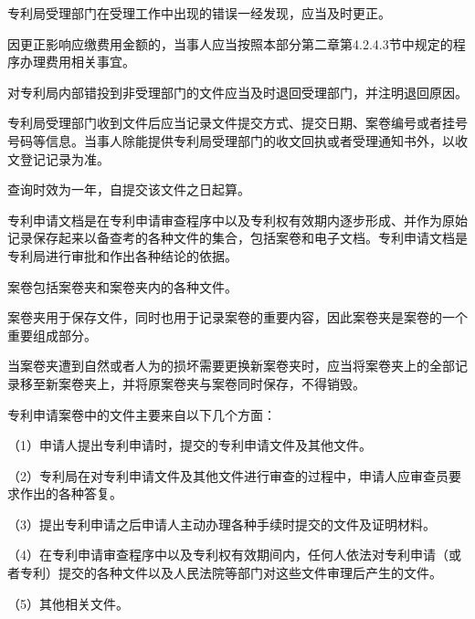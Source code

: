 专利局受理部门在受理工作中出现的错误一经发现，应当及时更正。

因更正影响应缴费用金额的，当事人应当按照本部分第二章第4.2.4.3节中规定的程序办理费用相关事宜。

对专利局内部错投到非受理部门的文件应当及时退回受理部门，并注明退回原因。

专利局受理部门收到文件后应当记录文件提交方式、提交日期、案卷编号或者挂号号码等信息。当事人除能提供专利局受理部门的收文回执或者受理通知书外，以收文登记记录为准。

查询时效为一年，自提交该文件之日起算。

专利申请文档是在专利申请审查程序中以及专利权有效期内逐步形成、并作为原始记录保存起来以备查考的各种文件的集合，包括案卷和电子文档。专利申请文档是专利局进行审批和作出各种结论的依据。

案卷包括案卷夹和案卷夹内的各种文件。

案卷夹用于保存文件，同时也用于记录案卷的重要内容，因此案卷夹是案卷的一个重要组成部分。

当案卷夹遭到自然或者人为的损坏需要更换新案卷夹时，应当将案卷夹上的全部记录移至新案卷夹上，并将原案卷夹与案卷同时保存，不得销毁。

专利申请案卷中的文件主要来自以下几个方面：

{\setlength{\parindent}{17.1bp}（1）申请人提出专利申请时，提交的专利申请文件及其他文件。\par}

{\setlength{\parindent}{17.1bp}（2）专利局在对专利申请文件及其他文件进行审查的过程中，申请人应审查员要求作出的各种答复。\par}

{\setlength{\parindent}{17.1bp}（3）提出专利申请之后申请人主动办理各种手续时提交的文件及证明材料。\par}

{\setlength{\parindent}{17.1bp}（4）在专利申请审查程序中以及专利权有效期间内，任何人依法对专利申请（或者专利）提交的各种文件以及人民法院等部门对这些文件审理后产生的文件。\par}

{\setlength{\parindent}{17.1bp}（5）其他相关文件。\par}

